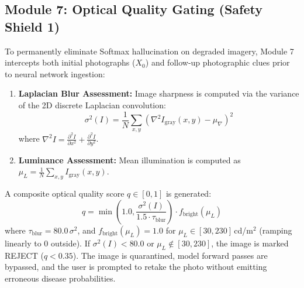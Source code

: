 \documentclass[conference]{IEEEtran}
\begin{document}
\subsection{Module 7: Optical Quality Gating (Safety Shield 1)}
To permanently eliminate Softmax hallucination on degraded imagery, Module 7 intercepts both initial photographs ($X_0$) and follow-up photographic clues prior to neural network ingestion:
\begin{enumerate}
    \item \textbf{Laplacian Blur Assessment:} Image sharpness is computed via the variance of the 2D discrete Laplacian convolution:
    \begin{equation}
        \sigma^2(I) = \frac{1}{N} \sum_{x,y} \left( \nabla^2 I_{\text{gray}}(x,y) - \mu_{\nabla} \right)^2
    \end{equation}
    where $\nabla^2 I = \frac{\partial^2 I}{\partial x^2} + \frac{\partial^2 I}{\partial y^2}$.
    \item \textbf{Luminance Assessment:} Mean illumination is computed as $\mu_L = \frac{1}{N} \sum_{x,y} I_{\text{gray}}(x,y)$.
\end{enumerate}

A composite optical quality score $q \in [0, 1]$ is generated:
\begin{equation}
    q = \min\left(1.0, \frac{\sigma^2(I)}{1.5 \cdot \tau_{\text{blur}}}\right) \cdot f_{\text{bright}}(\mu_L)
\end{equation}
where $\tau_{\text{blur}} = 80.0$\,$\sigma^2$, and $f_{\text{bright}}(\mu_L) = 1.0$ for $\mu_L \in [30, 230]$\,cd/m$^2$ (ramping linearly to 0 outside).
If $\sigma^2(I) < 80.0$ or $\mu_L \notin [30, 230]$, the image is marked REJECT ($q < 0.35$). The image is quarantined, model forward passes are bypassed, and the user is prompted to retake the photo without emitting erroneous disease probabilities.
\end{document}
